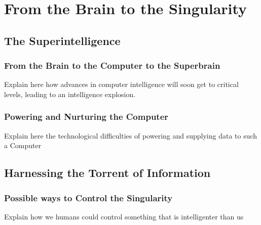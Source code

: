 \documentclass[
			12pt,
			a4paper,
			cleardoublepage=empty,
			final,
			twoside
				]{scrbook}
\begin{document}
\chapter{From the Brain to the Singularity}
\section{The Superintelligence}
\subsection{From the Brain to the Computer to the Superbrain}
\begin{par}

	Explain here how advances in computer intelligence will soon get to critical levels, leading to an intelligence explosion.

\end{par}
\subsection{Powering and Nurturing the Computer}
\begin{par}

	Explain here the technological difficulties of powering and supplying data to such a Computer

\end{par}

\section{Harnessing the Torrent of Information}
\subsection{Possible ways to Control the Singularity}
\begin{par}

	Explain how we humans could control something that is intelligenter than us

\end{par}



\cleardoubleemptypage

\backmatter

{}


\end{document}
